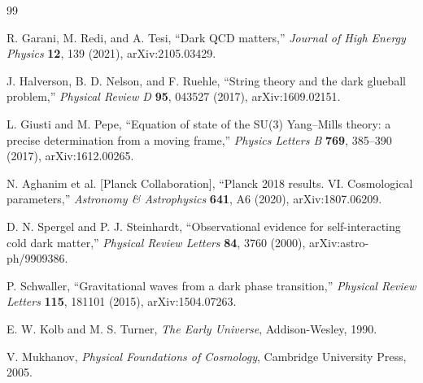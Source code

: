 \documentclass[11pt]{article}
\theoremstyle{remark}
\begin{document}
\begin{thebibliography}{99}

R. Garani, M. Redi, and A. Tesi,
``Dark QCD matters,''
\textit{Journal of High Energy Physics} \textbf{12}, 139 (2021), arXiv:2105.03429.

J. Halverson, B. D. Nelson, and F. Ruehle,
``String theory and the dark glueball problem,''
\textit{Physical Review D} \textbf{95}, 043527 (2017), arXiv:1609.02151.

L. Giusti and M. Pepe,
``Equation of state of the SU(3) Yang--Mills theory: a precise determination from a moving frame,''
\textit{Physics Letters B} \textbf{769}, 385--390 (2017), arXiv:1612.00265.

N. Aghanim et al. [Planck Collaboration],
``Planck 2018 results. VI. Cosmological parameters,''
\textit{Astronomy \& Astrophysics} \textbf{641}, A6 (2020), arXiv:1807.06209.

D. N. Spergel and P. J. Steinhardt,
``Observational evidence for self-interacting cold dark matter,''
\textit{Physical Review Letters} \textbf{84}, 3760 (2000), arXiv:astro-ph/9909386.

P. Schwaller,
``Gravitational waves from a dark phase transition,''
\textit{Physical Review Letters} \textbf{115}, 181101 (2015), arXiv:1504.07263.

E. W. Kolb and M. S. Turner,
\textit{The Early Universe}, Addison-Wesley, 1990.

V. Mukhanov,
\textit{Physical Foundations of Cosmology}, Cambridge University Press, 2005.

\end{thebibliography}
\end{document}
